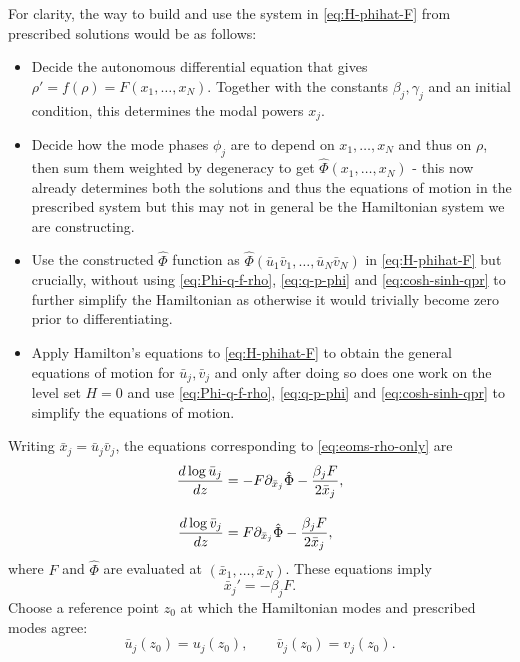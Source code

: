 \documentclass[11pt,a4paper]{article}
\numberwithin{equation}{section}
\begin{document}
For clarity, the way to build and use the system in \eqref{eq:H-phihat-F} from prescribed solutions would be as follows:
\begin{itemize}
   \item Decide the autonomous differential equation that gives $\rho'=f\left(\rho\right)=F\left(x_1,\dots,x_N\right)$. Together with the constants $\beta_j,\gamma_j$ and an initial condition, this determines the modal powers $x_j$.
   \item Decide how the mode phases $\phi_j$ are to depend on $x_1,\dots, x_N$ and thus on $\rho$, then sum them weighted by degeneracy to get $\hat{\Phi}\left(x_1,\dots,x_N\right)$ - this now already determines both the solutions and thus the equations of motion in the prescribed system but this may not in general be the Hamiltonian system we are constructing.
   \item Use the constructed $\hat{\Phi}$ function as $\hat{\Phi}\left(\bar{u}_1 \bar{v}_1,\dots, \bar{u}_N \bar{v}_N\right)$ in \eqref{eq:H-phihat-F} but crucially, without using \eqref{eq:Phi-q-f-rho}, \eqref{eq:q-p-phi} and \eqref{eq:cosh-sinh-qpr} to further simplify the Hamiltonian as otherwise it would trivially become zero prior to differentiating.
   \item Apply Hamilton's equations to \eqref{eq:H-phihat-F} to obtain the general equations of motion for $\bar{u}_j, \bar{v}_j$ and only after doing so does one work on the level set $H=0$ and use \eqref{eq:Phi-q-f-rho}, \eqref{eq:q-p-phi} and \eqref{eq:cosh-sinh-qpr} to simplify the equations of motion.
\end{itemize}
Writing $\bar{x}_j=\bar{u}_j\bar{v}_j$, the equations corresponding to \eqref{eq:eoms-rho-only} are
\begin{align}
    \frac{d \log{\bar{u}_j}}{dz} &= -F\partial_{\bar{x}_j}\hat{\Phi} - \frac{\beta_j F}{2 \bar{x}_j}, \notag \\[10pt]
    \frac{d \log{\bar{v}_j}}{dz} &= F\partial_{\bar{x}_j}\hat{\Phi} - \frac{\beta_j F}{2 \bar{x}_j}, \label{eq:eoms-fhat-phihat}
\end{align}
where $F$ and $\hat{\Phi}$ are evaluated at $(\bar{x}_1,\dots,\bar{x}_N)$. These equations imply
\begin{equation}
    \bar{x}_j'=-\beta_jF.
\end{equation}
Choose a reference point $z_0$ at which the Hamiltonian modes and prescribed modes agree:
\begin{equation}
    \bar{u}_j(z_0)=u_j(z_0),
    \qquad
    \bar{v}_j(z_0)=v_j(z_0).
\end{equation}
\end{document}
